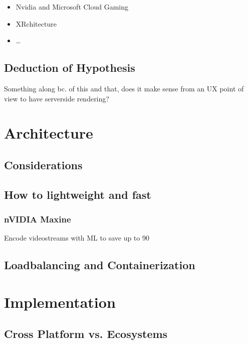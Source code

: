 \documentclass[titlepage, a4paper, 11pt]{scrartcl}
\begin{document}
                \begin{itemize}
                    \item Nvidia and Microsoft Cloud Gaming
                    \item XRchitecture
                    \item \dots
                \end{itemize}

        \subsection{Deduction of Hypothesis}

            Something along bc. of this and that, does it make sense from an UX point of view to have serverside rendering?

    \section{Architecture}

        \subsection{Considerations}

        \subsection{How to lightweight and fast}
		
			\subsubsection{nVIDIA Maxine}
				
				Encode videostreams with ML to save up to 90%

        \subsection{Loadbalancing and Containerization}

    \section{Implementation}

        \subsection{Cross Platform vs. Ecosystems}
\end{document}
